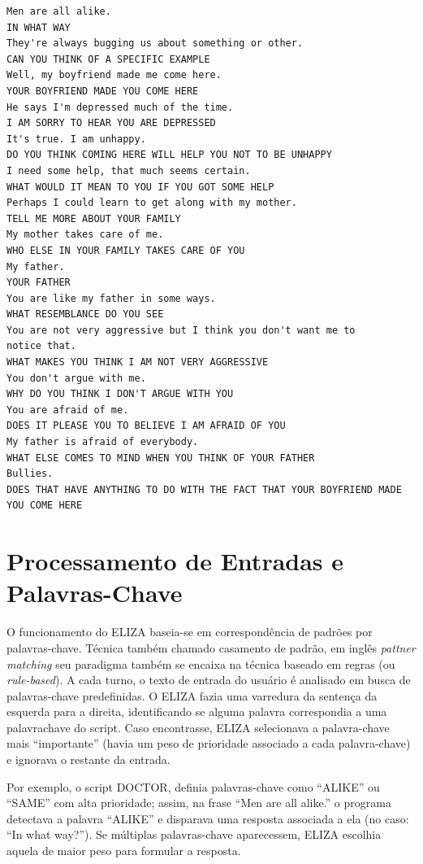 \documentclass[14pt,a4paper,oneside]{book}
\begin{document}
\begin{lstlisting}
Men are all alike. 
IN WHAT WAY 
They're always bugging us about something or other. 
CAN YOU THINK OF A SPECIFIC EXAMPLE 
Well, my boyfriend made me come here. 
YOUR BOYFRIEND MADE YOU COME HERE 
He says I'm depressed much of the time. 
I AM SORRY TO HEAR YOU ARE DEPRESSED 
It's true. I am unhappy. 
DO YOU THINK COMING HERE WILL HELP YOU NOT TO BE UNHAPPY 
I need some help, that much seems certain. 
WHAT WOULD IT MEAN TO YOU IF YOU GOT SOME HELP 
Perhaps I could learn to get along with my mother. 
TELL ME MORE ABOUT YOUR FAMILY 
My mother takes care of me. 
WHO ELSE IN YOUR FAMILY TAKES CARE OF YOU 
My father. 
YOUR FATHER 
You are like my father in some ways. 
WHAT RESEMBLANCE DO YOU SEE 
You are not very aggressive but I think you don't want me to 
notice that. 
WHAT MAKES YOU THINK I AM NOT VERY AGGRESSIVE 
You don't argue with me. 
WHY DO YOU THINK I DON'T ARGUE WITH YOU 
You are afraid of me. 
DOES IT PLEASE YOU TO BELIEVE I AM AFRAID OF YOU 
My father is afraid of everybody. 
WHAT ELSE COMES TO MIND WHEN YOU THINK OF YOUR FATHER 
Bullies. 
DOES THAT HAVE ANYTHING TO DO WITH THE FACT THAT YOUR BOYFRIEND MADE YOU COME HERE 
\end{lstlisting}
	




\section{Processamento de Entradas e Palavras-Chave}

O funcionamento do ELIZA baseia-se em correspondência de padrões por palavras-chave. Técnica também chamado casamento de padrão, em inglês \textit{pattner matching} seu paradigma também se encaixa na técnica baseado em regras (ou \textit{rule-based}). 
A cada turno, o texto de entrada do usuário é analisado em busca de palavras-chave predefinidas. 
O ELIZA fazia uma varredura da sentença da esquerda para a direita, identificando se alguma palavra correspondia a uma palavra\-chave do script. 
Caso encontrasse, ELIZA selecionava a palavra-chave mais “importante” (havia um peso de prioridade associado a cada palavra-chave) e ignorava o restante da entrada.

Por exemplo, o script DOCTOR, definia palavras-chave como “ALIKE” ou “SAME” com alta prioridade; assim, na frase “Men are all alike.” o programa detectava a palavra “ALIKE” e disparava uma resposta associada a ela (no caso: “In what way?”). 
Se múltiplas palavras-chave aparecessem, ELIZA escolhia aquela de maior peso para formular a resposta.
\end{document}
